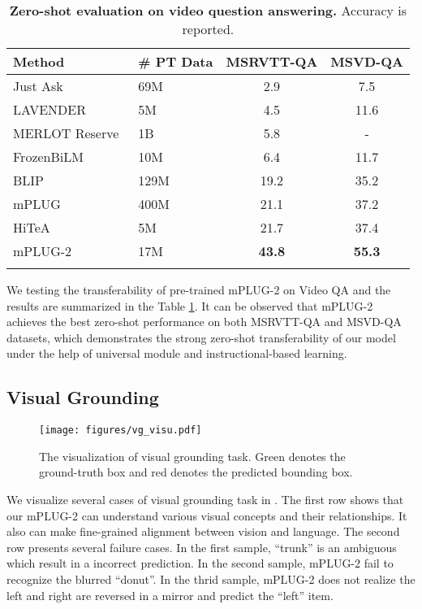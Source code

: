 \documentclass{article}
\theoremstyle{plain}
\theoremstyle{definition}
\theoremstyle{remark}
\newlength\savewidth
\newcommand\shline{\noalign{\global\savewidth\arrayrulewidth\global\arrayrulewidth 1pt}\hline\noalign{\global\arrayrulewidth\savewidth}}
\newcommand{\tablestyle}[2]{\setlength{\tabcolsep}{#1}\renewcommand{\arraystretch}{#2}\centering\small}
\newcommand{\modelname}{mPLUG-2 }
\begin{document}
\begin{table}[t!]
\centering
\caption{\textbf{Zero-shot evaluation on video question answering.} Accuracy is reported.}
    \tablestyle{7pt}{1.1} 
    \def \w{15pt}
\begin{tabular}{ll|cc}
\shline
Method & \# PT Data & MSRVTT-QA & MSVD-QA \\
        \hline
        Just Ask~\citep{yang2021justask} & 69M & 2.9 & 7.5 \\
        LAVENDER~\citep{li2022lavender} & 5M & 4.5 & 11.6 \\
        MERLOT Reserve~\citep{zellers2021merlot} & 1B & 5.8 & - \\
        FrozenBiLM~\citep{yang2022frozenbilm} & 10M & 6.4 & 11.7 \\
        BLIP~\citep{li2022blip} & 129M  &  19.2 & 35.2 \\
        mPLUG~\citep{Li2022mPLUGEA} & 400M & 21.1  & 37.2 \\
        HiTeA~\citep{Ye2022HiTeAHT} & 5M & 21.7 & 37.4 \\
        \hline
        \modelname & 17M & \textbf{43.8} & \textbf{55.3} \\
        \shline
\end{tabular}
\label{table:videoqa-zeroshot}
\end{table} We testing the transferability of pre-trained \modelname on Video QA and the results are summarized in the Table \ref{table:videoqa-zeroshot}. It can be observed that \modelname achieves the best zero-shot performance on both MSRVTT-QA and MSVD-QA datasets, which demonstrates the strong zero-shot transferability of our model under the help of universal module and instructional-based learning.

\subsection{Visual Grounding}
\begin{figure}
    \centering
    \texttt{[image: figures/vg\_visu.pdf]}
\caption{The visualization of visual grounding task. Green denotes the ground-truth box and red denotes the predicted bounding box.}
\label{fig:vg_visu}
\end{figure}
We visualize several cases of visual grounding task in . The first row shows that our \modelname can understand various visual concepts and their relationships. It also can make fine-grained alignment between vision and language. The second row presents several failure cases. In the first sample, ``trunk'' is an ambiguous which result in a incorrect prediction. In the second sample, \modelname fail to recognize the blurred ``donut''. In the thrid sample, \modelname does not realize the left and right are reversed in a mirror and predict the ``left'' item. 
\end{document}
